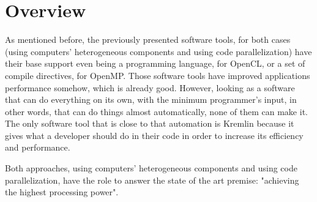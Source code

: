 
\section{Overview}

As mentioned before, the previously presented software tools, for both cases (using computers' heterogeneous components and using code parallelization) have their base support even being a programming language, for OpenCL, or a set of compile directives, for OpenMP. Those software tools have improved applications performance somehow, which is already good. However, looking as a software that can do everything on its own, with the minimum programmer's input, in other words, that can do things almost automatically, none of them can make it. The only software tool that is close to that automation is Kremlin because it gives what a developer should do in their code in order to increase its efficiency and performance.

Both approaches, using computers' heterogeneous components and using code parallelization, have the role to answer the state of the art premise: "achieving the highest processing power".  
